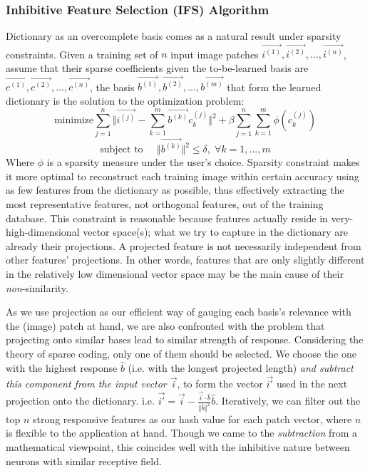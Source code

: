 \documentclass[letterpaper]{article}
\begin{document}
\subsubsection{Inhibitive Feature Selection (IFS) Algorithm}
Dictionary as an overcomplete basis comes as a natural result under sparsity constraints. Given a training set of $n$ input image patches $\overrightarrow{i^{(1)}},\overrightarrow{i^{(2)}},...,\overrightarrow{i^{(n)}}$, assume that their sparse coefficients given the to-be-learned basis are $\overrightarrow{c^{(1)}},\overrightarrow{c^{(2)}},...,\overrightarrow{c^{(n)}}$, the basis $\overrightarrow{b^{(1)}},\overrightarrow{b^{(2)}},...,\overrightarrow{b^{(m)}}$ that form the learned dictionary is the solution to the optimization problem:
\[\mbox{minimize}\sum_{j=1}^{n}\Vert \overrightarrow{i^{(j)}}-\sum_{k=1}^{m}\overrightarrow{b^{(k)}}c_k^{(j)}\Vert^2 + \beta \sum_{j=1}^{n}\sum_{k=1}^{m}\phi(c_k^{(j)})\]
\[\mbox{subject to}\;\;\;\;\; \Vert\overrightarrow{b^{(k)}}\Vert^2 \leq \delta,\; \forall k=1,...,m\]
Where $\phi$ is a sparsity measure under the user's choice.
Sparsity constraint makes it more optimal to reconstruct each training image within certain accuracy using as few features from the dictionary as possible, thus effectively extracting the most representative features, not orthogonal features, out of the training database. This constraint is reasonable because features actually reside in very-high-dimensional vector space(s); what we try to capture in the dictionary are already their projections. A projected feature is not necessarily independent from other features' projections. In other words, features that are only slightly different in the relatively low dimensional vector space may be the main cause of their \emph{non}-similarity.

As we use projection as our efficient way of gauging each basis's relevance with the (image) patch at hand, we are also confronted with the problem that projecting onto similar bases lead to similar strength of response. Considering the theory of sparse coding, only one of them should be selected. We choose the one with the highest response $\widehat{b}$ (i.e. with the longest projected length) \emph{and subtract this component from the input vector $\overrightarrow{i}$}, to form the vector $\overrightarrow{i'}$ used in the next projection onto the dictionary. i.e. $\overrightarrow{i'}=\overrightarrow{i}-\frac{\overrightarrow{i}\cdot\widehat{b}}{\Vert \widehat{b} \Vert ^{2}}\widehat{b}$. Iteratively, we can filter out the top $n$ strong responsive features as our hash value for each patch vector, where $n$ is flexible to the application at hand. Though we came to the \emph{subtraction} from a mathematical viewpoint, this coincides well with the inhibitive nature between neurons with similar receptive field.
\end{document}
